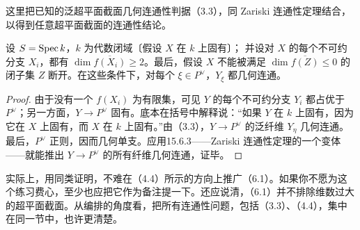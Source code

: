 这里把已知的泛超平面截面几何连通性判据（3.3），同 Zariski 连通性定理结合，以得到任意超平面截面的连通性结论。

设 $S=\operatorname{Spec} k$，$k$ 为代数闭域〔假设 $X$ 在 $k$ 上固有〕；
并设对 $X$ 的每个不可约分支 $X_i$，都有 $\dim\overline{f(X_i)}\geq2$。最后，假设 $X$ 不能被满足 $\dim\overline{f(Z)}\leq0$ 的闭子集 $Z$ 断开。在这些条件下，对每个 $\xi\in P^\vee$，$Y_\xi$ 都几何连通。
\begin{proof}
由于没有一个 $f(X_i)$ 为有限集，可见 $Y$ 的每个不可约分支 $Y_i$ 都占优于 $P^\vee$；另一方面，$Y\to P^\vee$ 固有。底本在括号中解释说：“如果 $Y$ 在 $k$ 上固有，因为它在 $X$ 上固有，而 $X$ 在 $k$ 上固有。”由（3.3），$Y\to P^\vee$ 的泛纤维 $Y_\eta$ 几何连通。最后，$P^\vee$ 正则，因而几何单支。应用15.6.3——Zariski 连通性定理的一个变体——就能推出 $Y\to P^\vee$ 的所有纤维几何连通，证毕。
\end{proof}
实际上，用同类证明，不难在（4.4）所示的方向上推广（6.1）。如果你不愿为这个练习费心，至少也应把它作为备注提一下。还应说清，（6.1）并不排除维数过大的超平面截面。从编排的角度看，把所有连通性问题，包括（3.3）、（4.4），集中在同一节中，也许更清楚。


